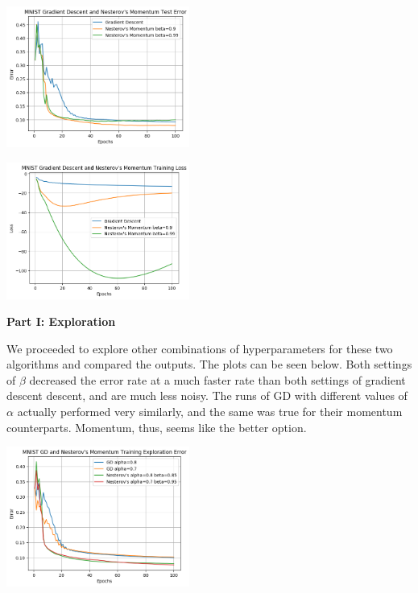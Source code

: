 \documentclass[10pt]{article}
\begin{document}
\begin{multicols}{2}
\begin{center}
    \includegraphics[width=0.45\textwidth]{GradientDescentandNesterov'sMomentumTestError.png}
\end{center}
\begin{center}
    \includegraphics[width=0.45\textwidth]{GradientDescentandNesterov'sMomentumTrainingLoss.png}
\end{center}
\noindent
\textbf{Part I: Exploration} \par
We proceeded to explore other combinations of hyperparameters for these two algorithms and compared the outputs. The plots can be seen below. Both settings of $\beta$ decreased the error rate at a much faster rate than both settings of gradient descent descent, and are much less noisy. The runs of GD with different values of $\alpha$ actually performed very similarly, and the same was true for their momentum counterparts. Momentum, thus, seems like the better option.\par
\begin{center}
    \includegraphics[width=0.45\textwidth]{GDandNesterov'sMomentumTrainingExplorationError.png}
\end{center}
\begin{center}

\end{center}
\end{multicols}
\end{document}
